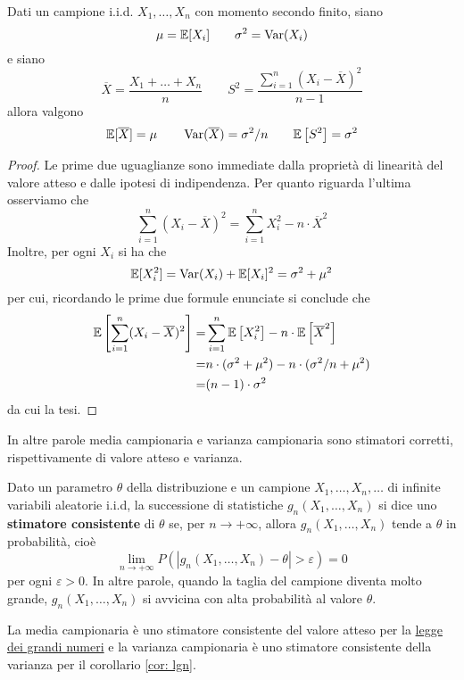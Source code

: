 \begin{proposition}
	Dati un campione i.i.d. $X_1, \dots, X_n$ con momento secondo finito, siano
	\[ \mu = \mathbb{E}[X_i] \quad \quad \sigma^2 = \operatorname{Var}(X_i) \]
	e siano
	\[ \overline{X} = \frac{X_1 + \dots + X_n}{n} \quad \quad
		S^2 = \dfrac{\sum_{i=1}^n (X_i - \overline{X})^2}{n-1}
	\]
	allora valgono
	\[
		\mathbb{E}[\overline{X}] = \mu \quad \quad
		\operatorname{Var}(\overline{X}) = \sigma^2 / n \quad \quad
		\mathbb{E} \left[ S^2 \right] = \sigma^2
	\]
	\begin{proof}
		Le prime due uguaglianze sono immediate dalla proprietà di linearità del valore atteso e
		dalle ipotesi di indipendenza. Per quanto riguarda l'ultima osserviamo che
		\[ \sum_{i=1}^n (X_i - \overline{X})^2 = \sum_{i=1}^n X_i^2 - n \cdot \overline{X}^2 \]
		Inoltre, per ogni $X_i$ si ha che
		\[ \mathbb{E}[X_i^2] = \operatorname{Var}(X_i) + \mathbb{E}[X_i]^2 = \sigma^2 + \mu^2 \]
		per cui, ricordando le prime due formule enunciate si conclude che
		\begin{align*}
			\mathbb{E} \left[ \sum_{i=1}^n (X_i - \overline{X})^2 \right]
			= & \sum_{i=1}^n \mathbb{E} \left[ X_i^2 \right] - n \cdot \mathbb{E} \left[ \overline{X}^2 \right] \\
			= & n \cdot (\sigma^2 + \mu^2) - n \cdot (\sigma^2 / n + \mu^2)                     \\
			= & (n-1) \cdot \sigma^2
		\end{align*}
		da cui la tesi.
	\end{proof}
\end{proposition}

In altre parole media campionaria e varianza campionaria sono stimatori corretti,
rispettivamente di valore atteso e varianza.

\begin{definition}\label{def: stimatore consistente}
	Dato un parametro $\theta$ della distribuzione e un campione $X_1, \dots, X_n, \dots$ di
	infinite variabili aleatorie i.i.d, la successione di statistiche $g_n(X_1, \dots, X_n)$ si
	dice uno \textbf{stimatore consistente} di $\theta$ se, per $n \to +\infty$, allora
	$g_n(X_1, \dots, X_n)$ tende a $\theta$ in probabilità, cioè
	\[ \lim_{n \to +\infty} P(|g_n(X_1, \dots, X_n) - \theta| > \varepsilon) = 0 \]
	per ogni $\varepsilon > 0$. In altre parole, quando la taglia del campione diventa molto
	grande, $g_n(X_1, \dots, X_n)$ si avvicina con alta probabilità al valore $\theta$.
\end{definition}

La media campionaria è uno stimatore consistente del valore atteso per la
\hyperref[th: lgn]{legge dei grandi numeri} e la varianza campionaria è uno stimatore consistente
della varianza per il corollario \ref{cor: lgn}.

